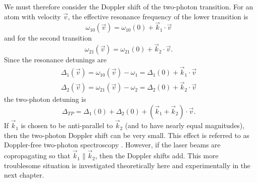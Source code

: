 We must therefore consider the Doppler shift of the two-photon transition. 
For an atom with velocity $\vec{v}$, the effective resonance frequency of the
lower transition is
\begin{equation}
\omega_{10}(\vec{v}) = \omega_{10}(0) + \vec{k}_1 \cdot \vec{v}
\end{equation}
and for the second transition
\begin{equation}
\omega_{21}(\vec{v}) = \omega_{21}(0) + \vec{k}_2 \cdot \vec{v}.
\end{equation}
Since the resonance detunings are
\begin{eqnarray}
\Delta_1(\vec{v}) = \omega_{10}(\vec{v}) - \omega_1 = \Delta_1(0) + \vec{k}_1
\cdot
\vec{v}
\\
\Delta_2(\vec{v}) = \omega_{21}(\vec{v}) - \omega_2= \Delta_2(0) + \vec{k}_2
\cdot
\vec{v}
\end{eqnarray}
the two-photon detuning is
\begin{equation}
\Delta_{TP} = \Delta_1(0) + \Delta_2(0) + (\vec{k}_1+\vec{k}_2) \cdot \vec{v}.
\end{equation}
If $\vec{k}_1$ is chosen to be anti-parallel to $\vec{k}_2$ (and to have nearly
equal magnitudes), then the two-photon Doppler shift can be very small.  This
effect is referred to as Doppler-free two-photon spectroscopy
\cite{Corney_book}.  However, if the laser beams are copropagating so that
$\vec{k}_1 \parallel \vec{k}_2$, then the Doppler shifts add.  This more
troublesome situation is investigated theoretically here and
experimentally in the next chapter.

